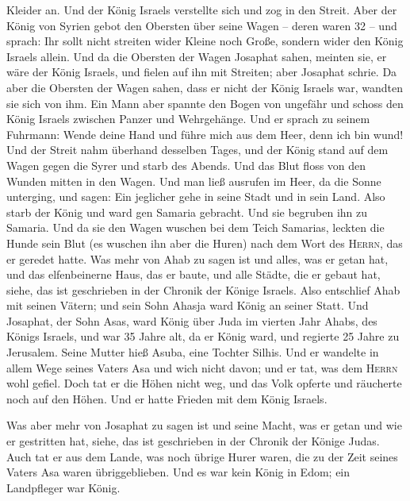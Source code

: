 Kleider an. Und der König Israels verstellte sich und zog in den Streit.
 Aber der König von Syrien gebot den Obersten über seine
Wagen -- deren waren 32 -- und sprach: Ihr sollt nicht streiten wider
Kleine noch Große, sondern wider den König Israels allein.
 Und da die Obersten der Wagen Josaphat sahen, meinten
sie, er wäre der König Israels, und fielen auf ihn mit Streiten; aber
Josaphat schrie.  Da aber die Obersten der Wagen sahen,
dass er nicht der König Israels war, wandten sie sich von ihm.
 Ein Mann aber spannte den Bogen von ungefähr und schoss
den König Israels zwischen Panzer und Wehrgehänge. Und er sprach zu
seinem Fuhrmann: Wende deine Hand und führe mich aus dem Heer, denn ich
bin wund!  Und der Streit nahm überhand desselben Tages,
und der König stand auf dem Wagen gegen die Syrer und starb des Abends.
Und das Blut floss von den Wunden mitten in den Wagen. 
Und man ließ ausrufen im Heer, da die Sonne unterging, und sagen: Ein
jeglicher gehe in seine Stadt und in sein Land.  Also
starb der König und ward gen Samaria gebracht. Und sie begruben ihn zu
Samaria.  Und da sie den Wagen wuschen bei dem Teich
Samarias, leckten die Hunde sein Blut (es wuschen ihn aber die Huren)
nach dem Wort des \textsc{Herrn}, das er geredet hatte. 
Was mehr von Ahab zu sagen ist und alles, was er getan hat, und das
elfenbeinerne Haus, das er baute, und alle Städte, die er gebaut hat,
siehe, das ist geschrieben in der Chronik der Könige Israels.
 Also entschlief Ahab mit seinen Vätern; und sein Sohn
Ahasja ward König an seiner Statt.  Und Josaphat, der
Sohn Asas, ward König über Juda im vierten Jahr Ahabs, des Königs
Israels,  und war 35 Jahre alt, da er König ward, und
regierte 25 Jahre zu Jerusalem. Seine Mutter hieß Asuba, eine Tochter
Silhis.  Und er wandelte in allem Wege seines Vaters Asa
und wich nicht davon; und er tat, was dem \textsc{Herrn} wohl gefiel.
 Doch tat er die Höhen nicht weg, und das Volk opferte
und räucherte noch auf den Höhen.  Und er hatte Frieden
mit dem König Israels.

 Was aber mehr von Josaphat zu sagen ist und seine Macht,
was er getan und wie er gestritten hat, siehe, das ist geschrieben in
der Chronik der Könige Judas.  Auch tat er aus dem Lande,
was noch übrige Hurer waren, die zu der Zeit seines Vaters Asa waren
übriggeblieben.  Und es war kein König in Edom; ein
Landpfleger war König.

